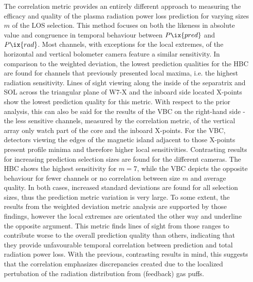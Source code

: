                 The correlation metric provides an entirely different approach to measuring the efficacy and quality of the plasma radiation power loss prediction for varying sizes $m$ of the LOS selection. This method focuses on both the likeness in absolute value and congruence in temporal behaviour between $P\ix{pred}$ and $P\ix{rad}$. Most channels, with exceptions for the local extremes, of the horizontal and vertical bolometer camera feature a similar sensitivity. In comparison to the weighted deviation, the lowest prediction qualities for the HBC are found for channels that previously presented local maxima, i.e. the highest radiation sensitivity. Lines of sight viewing along the inside of the separatrix and SOL across the triangular plane of W7-X and the inboard side located X-points show the lowest prediction quality for this metric. With respect to the prior analysis, this can also be said for the results of the VBC on the right-hand side - the less sensitive channels, measured by the correlation metric, of the vertical array only watch part of the core and the inboard X-points. For the VBC, detectors viewing the edges of the magnetic island adjacent to those X-points present profile minima and therefore higher local sensitivities. Contrasting results for increasing prediction selection sizes are found for the different cameras. The HBC shows the highest sensitivity for $m=7$, while the VBC depicts the opposite behaviour for fewer channels or no correlation between size $m$ and average quality. In both cases, increased standard deviations are found for all selection sizes, thus the prediction metric variation is very large. To some extent, the results from the weighted deviation metric analysis are supported by those findings, however the local extremes are orientated the other way and underline the opposite argument. This metric finds lines of sight from those ranges to contribute worse to the overall prediction quality than others, indicating that they provide unfavourable temporal correlation between prediction and total radiation power loss. With the previous, contrasting results in mind, this suggests that the correlation emphasizes discrepancies created due to the localized pertubation of the radiation distribution from (feedback) gas puffs.%
%
